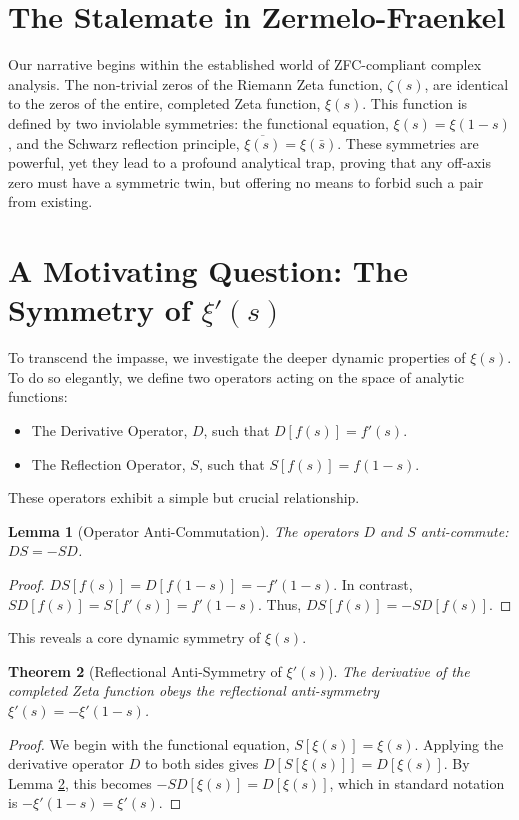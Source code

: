 \documentclass{article}
\theoremstyle{plain}
\newtheorem{theorem}{Theorem}[section]
\newtheorem{lemma}[theorem]{Lemma}
\theoremstyle{definition}
\theoremstyle{remark}
\begin{document}
\section{The Stalemate in Zermelo-Fraenkel}
\label{sec:stalemate}
Our narrative begins within the established world of ZFC-compliant complex analysis. The non-trivial zeros of the Riemann Zeta function, $\zeta(s)$, are identical to the zeros of the entire, completed Zeta function, $\xi(s)$. This function is defined by two inviolable symmetries: the functional equation, $\xi(s) = \xi(1-s)$, and the Schwarz reflection principle, $\overline{\xi(s)} = \xi(\bar{s})$. These symmetries are powerful, yet they lead to a profound analytical trap, proving that any off-axis zero must have a symmetric twin, but offering no means to forbid such a pair from existing.

\section{A Motivating Question: The Symmetry of $\xi'(s)$}
\label{sec:question}
To transcend the impasse, we investigate the deeper dynamic properties of $\xi(s)$. To do so elegantly, we define two operators acting on the space of analytic functions:
\begin{itemize}
    \item The Derivative Operator, $D$, such that $D[f(s)] = f'(s)$.
    \item The Reflection Operator, $S$, such that $S[f(s)] = f(1-s)$.
\end{itemize}
These operators exhibit a simple but crucial relationship.

\begin{lemma}[Operator Anti-Commutation]
The operators $D$ and $S$ anti-commute: $DS = -SD$.
\end{lemma}
\begin{proof}
$DS[f(s)] = D[f(1-s)] = -f'(1-s)$. In contrast, $SD[f(s)] = S[f'(s)] = f'(1-s)$. Thus, $DS[f(s)] = -SD[f(s)]$.
\end{proof}

This reveals a core dynamic symmetry of $\xi(s)$.
\begin{theorem}[Reflectional Anti-Symmetry of $\xi'(s)$]
The derivative of the completed Zeta function obeys the reflectional anti-symmetry $\xi'(s) = -\xi'(1-s)$.
\end{theorem}
\begin{proof}
We begin with the functional equation, $S[\xi(s)] = \xi(s)$. Applying the derivative operator $D$ to both sides gives $D[S[\xi(s)]] = D[\xi(s)]$. By Lemma \ref{sec:question}, this becomes $-SD[\xi(s)] = D[\xi(s)]$, which in standard notation is $-\xi'(1-s) = \xi'(s)$.
\end{proof}
\end{document}
